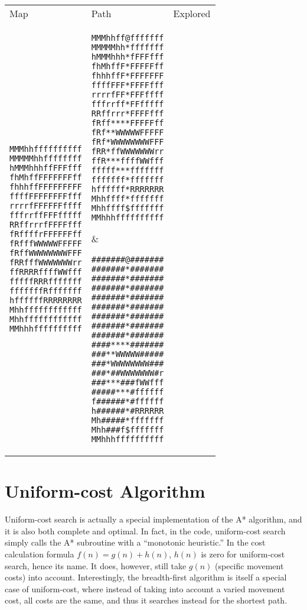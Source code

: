 \documentclass[12pt, article]{scrartcl}
\begin{document}
\begin{tabular}{p{2in} p{2in} p{2in}}
Map & Path & Explored \\

\begin{verbatim}
MMMhhffffffffff
MMMMMhhffffffff
hMMMhhhffFFFfff
fhMhffFFFFFFFff
fhhhffFFFFFFFFF
ffffFFFFFFFFfff
rrrrfFFFFFFffff
fffrrffFFFfffff
RRffrrrfFFFFfff
fRffffrFFFFFFff
fRfffWWWWWFFFFF
fRffWWWWWWWWFFF
fRRfffWWWWWWWrr
ffRRRRffffWWfff
fffffRRRfffffff
fffffffRfffffff
hffffffRRRRRRRR
Mhhffffffffffff
Mhhffffffffffff
MMhhhffffffffff
\end{verbatim}
&
\begin{verbatim}
MMMhhff@fffffff
MMMMMhh*fffffff
hMMMhhh*fFFFfff
fhMhffF*FFFFFff
fhhhffF*FFFFFFF
ffffFFF*FFFFfff
rrrrfFF*FFFffff
fffrrff*FFfffff
RRffrrr*FFFFfff
fRff****FFFFFff
fRf**WWWWWFFFFF
fRf*WWWWWWWWFFF
fRR*ffWWWWWWWrr
ffR***ffffWWfff
fffff***fffffff
fffffff*fffffff
hffffff*RRRRRRR
Mhhffff*fffffff
Mhhffff$fffffff
MMhhhffffffffff
\end{verbatim}
&
\begin{verbatim}
#######@#######
#######*#######
#######*#######
#######*#######
#######*#######
#######*#######
#######*#######
#######*#######
#######*#######
####****#######
###**WWWWW#####
###*WWWWWWWW###
###*##WWWWWWW#r
###***###fWWfff
#####***#ffffff
f######*#ffffff
h######*#RRRRRR
Mh#####*fffffff
Mhh###f$fffffff
MMhhhffffffffff
\end{verbatim}
\end{tabular}

\section{Uniform-cost Algorithm}
Uniform-cost search is actually a special implementation of the A* algorithm, and it is also both complete and optimal. In fact, in the code, uniform-cost search simply calls the A* subroutine with a ``monotonic heuristic.'' In the cost calculation formula $f(n) = g(n) + h(n)$, $h(n)$ is zero for uniform-cost search, hence its name. It does, however, still take $g(n)$ (specific movement costs) into account. Interestingly, the breadth-first algorithm is itself a special case of uniform-cost, where instead of taking into account a varied movement cost, all costs are the same, and thus it searches instead for the shortest path.
\end{document}
